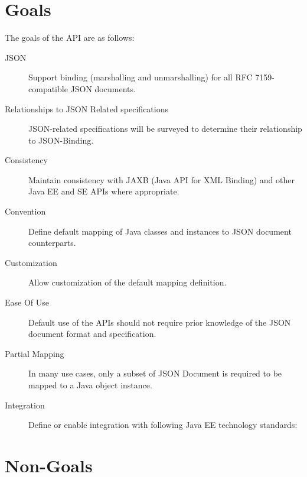\section{Goals}

The goals of the API are as follows:

\begin{description}

\item[JSON] 
Support binding (marshalling and unmarshalling) for all RFC 7159-compatible JSON documents.

\item [Relationships to JSON Related specifications]
JSON-related specifications will be surveyed to determine their relationship to JSON-Binding.

\item[Consistency] 
Maintain consistency with JAXB (Java API for XML Binding) and other Java EE and SE APIs where appropriate.

\item[Convention] 
Define default mapping of Java classes and instances to JSON document counterparts.

\item[Customization] 
Allow customization of the default mapping definition.

\item[Ease Of Use] 
Default use of the APIs should not require prior knowledge of the JSON document format and specification.

\item[Partial Mapping] 
In many use cases, only a subset of JSON Document is required to be mapped to a Java object instance.

\item[Integration]
Define or enable integration with following Java EE technology standards:
  
\end{description}

\section{Non-Goals}
\label{non_goals}


